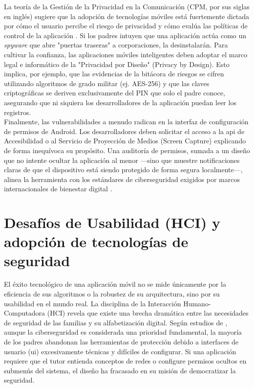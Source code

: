 La teoría de la Gestión de la Privacidad en la Comunicación (CPM, por sus siglas en inglés) sugiere que la adopción de tecnologías móviles está fuertemente dictada por cómo el usuario percibe el riesgo de privacidad y cómo evalúa las políticas de control de la aplicación \cite{balapour_mobile_2020}. Si los padres intuyen que una aplicación actúa como un \textit{spyware} que abre "puertas traseras" a corporaciones, la desinstalarán. Para cultivar la confianza, las aplicaciones móviles inteligentes deben adoptar el marco legal e informático de la "Privacidad por Diseño" (Privacy by Design). Esto implica, por ejemplo, que las evidencias de la bitácora de riesgos se cifren utilizando algoritmos de grado militar (ej. AES-256) y que las claves criptográficas se deriven exclusivamente del PIN que solo el padre conoce, asegurando que ni siquiera los desarrolladores de la aplicación puedan leer los registros.\\

Finalmente, las vulnerabilidades a menudo radican en la interfaz de configuración de permisos de Android. Los desarrolladores deben solicitar el acceso a la \gls{api} de Accesibilidad o al Servicio de Proyección de Medios (Screen Capture) explicando de forma inequívoca su propósito. Una auditoría de permisos, sumada a un diseño que no intente ocultar la aplicación al menor —sino que muestre notificaciones claras de que el dispositivo está siendo protegido de forma segura localmente—, alinea la herramienta con los estándares de ciberseguridad exigidos por marcos internacionales de bienestar digital \cite{ayyash_cybersecurity_2024, noauthor_full_2025}.

\section{Desafíos de Usabilidad (HCI) y adopción de tecnologías de seguridad}

El éxito tecnológico de una aplicación móvil no se mide únicamente por la eficiencia de sus algoritmos o la robustez de su arquitectura, sino por su usabilidad en el mundo real. La disciplina de la Interacción Humano-Computadora (HCI) revela que existe una brecha dramática entre las necesidades de seguridad de las familias y su alfabetización digital. Según estudios de \cite{ayyash_cybersecurity_2024}, aunque la ciberseguridad es considerada una prioridad fundamental, la mayoría de los padres abandonan las herramientas de protección debido a interfaces de usuario (\gls{ui}) excesivamente técnicas y difíciles de configurar. Si una aplicación requiere que el tutor entienda conceptos de redes o configure permisos ocultos en submenús del sistema, el diseño ha fracasado en su misión de democratizar la seguridad.\\

